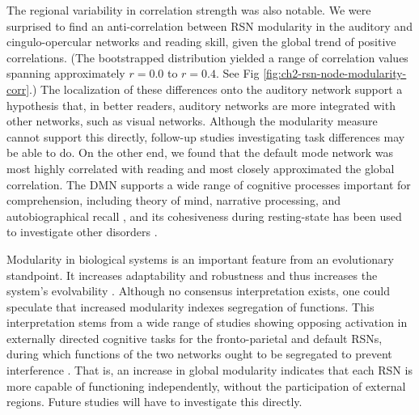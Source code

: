 The regional variability in correlation strength was also notable. We were surprised to find an anti-correlation between RSN modularity in the auditory and cingulo-opercular networks and reading skill, given the global trend of positive correlations. (The bootstrapped distribution yielded a range of correlation values spanning approximately $r = 0.0$ to $r = 0.4$. See Fig \ref{fig:ch2-rsn-node-modularity-corr}.) The localization of these differences onto the auditory network support a hypothesis that, in better readers, auditory networks are more integrated with other networks, such as visual networks. Although the modularity measure cannot support this directly, follow-up studies investigating task differences may be able to do. On the other end, we found that the default mode network was most highly correlated with reading and most closely approximated the global correlation. The DMN supports a wide range of cognitive processes important for comprehension, including theory of mind, narrative processing, and autobiographical recall \citep{Buckner2008, AbdulSabur2014}, and its cohesiveness during resting-state has been used to investigate other disorders \citep{Uddin2008}. 

Modularity in biological systems is an important feature from an evolutionary standpoint. It increases adaptability and robustness and thus increases the system's evolvability \citep{Sporns2016}. Although no consensus interpretation exists, one could speculate that increased modularity indexes segregation of functions. This interpretation stems from a wide range of studies showing opposing activation in externally directed cognitive tasks for the fronto-parietal and default RSNs, during which functions of the two networks ought to be segregated to prevent interference \citep{Reineberg2018}. That is, an increase in global modularity indicates that each RSN is more capable of functioning independently, without the participation of external regions. Future studies will have to investigate this directly.

